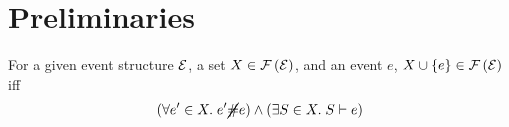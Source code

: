 \section{Preliminaries}

\begin{prop}\label{prop:es-induction}
For a given event structure $\mathcal{E}$, a set $X \in \mathcal{F} \left( \mathcal{E} \right)$,
and an event $e$, $X \cup \left\{ e \right\} \in \mathcal{F} \left( \mathcal{E} \right)$ iff
\[ ( \forall e' \in X.\; e' \cancel{\#} e ) \wedge
  ( \exists S \in X.\; S \vdash e ) \]
\end{prop}